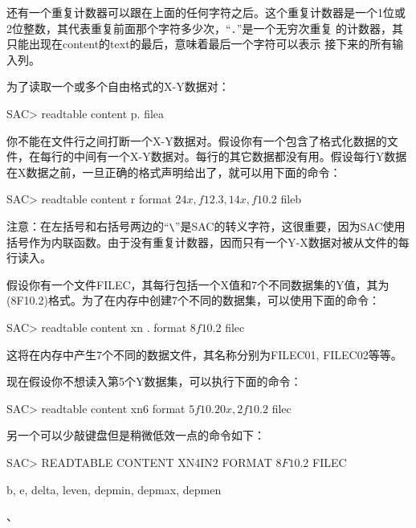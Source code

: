 还有一个重复计数器可以跟在上面的任何字符之后。这个重复计数器是一个1位或
2位整数，其代表重复前面那个字符多少次，``\texttt{.}''是一个无穷次重复
的计数器，其只能出现在content的text的最后，意味着最后一个字符可以表示
接下来的所有输入列。

为了读取一个或多个自由格式的X-Y数据对：
\begin{SACCode}
SAC> readtable content p. filea
\end{SACCode}

你不能在文件行之间打断一个X-Y数据对。假设你有一个包含了格式化数据的文件，在每行的中间有一个X-Y数据对。每行的其它数据都没有用。假设每行Y数据在X数据之前，一旦正确的格式声明给出了，就可以用下面的命令：
\begin{SACCode}
SAC> readtable content r format \(24x,f12.3,14x,f10.2\) fileb
\end{SACCode}
注意：在左括号和右括号两边的``\verb|\|''是SAC的转义字符，这很重要，因为SAC使用括号作为内联函数。由于没有重复计数器，因而只有一个Y-X数据对被从文件的每行读入。

假设你有一个文件FILEC，其每行包括一个X值和7个不同数据集的Y值，其为(8F10.2)格式。为了在内存中创建7个不同的数据集，可以使用下面的命令：
\begin{SACCode}
SAC> readtable content xn . format \(8f10.2\) filec
\end{SACCode}
这将在内存中产生7个不同的数据文件，其名称分别为FILEC01, FILEC02等等。

现在假设你不想读入第5个Y数据集，可以执行下面的命令：
\begin{SACCode}
SAC> readtable content xn6 format \(5f10.20x,2f10.2\) filec
\end{SACCode}
另一个可以少敲键盘但是稍微低效一点的命令如下：
\begin{SACCode}
SAC> READTABLE CONTENT XN4IN2 FORMAT \(8F10.2\) FILEC
\end{SACCode}

b, e, delta, leven, depmin, depmax, depmen

、
